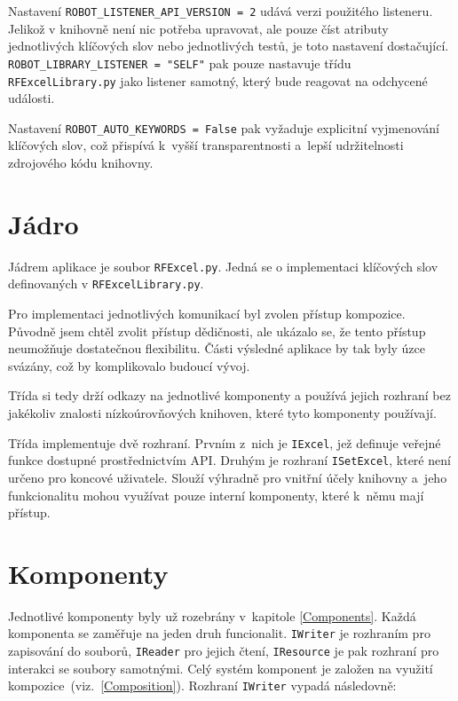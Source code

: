 Nastavení \texttt{ROBOT\_LISTENER\_API\_VERSION = 2} udává verzi použitého listeneru. Jelikož v knihovně není nic potřeba upravovat, ale pouze číst atributy jednotlivých klíčových slov nebo jednotlivých testů, je toto nastavení dostačující. \texttt{ROBOT\_LIBRARY\_LISTENER = "SELF"} pak pouze nastavuje třídu \texttt{RFExcelLibrary.py} jako listener samotný, který bude reagovat na odchycené události.

Nastavení \texttt{ROBOT\_AUTO\_KEYWORDS = False} pak vyžaduje explicitní vyjmenování klíčových slov, což přispívá k~vyšší transparentnosti a~lepší udržitelnosti zdrojového kódu knihovny.

\section{Jádro}

Jádrem aplikace je soubor \texttt{RFExcel.py}. Jedná se o implementaci klíčových slov definovaných v \texttt{RFExcelLibrary.py}.

Pro implementaci jednotlivých komunikací byl zvolen přístup kompozice. Původně jsem chtěl zvolit přístup dědičnosti, ale ukázalo se, že tento přístup neumožňuje dostatečnou flexibilitu. Části výsledné aplikace by tak byly úzce svázány, což by komplikovalo budoucí vývoj. 

Třída si tedy drží odkazy na jednotlivé komponenty a používá jejich rozhraní bez jakékoliv znalosti nízkoúrovňových knihoven, které tyto komponenty používají.

Třída implementuje dvě rozhraní. Prvním z~nich je \texttt{IExcel}, jež definuje veřejné funkce dostupné prostřednictvím API. Druhým je rozhraní \texttt{ISetExcel}, které není určeno pro koncové uživatele. Slouží výhradně pro vnitřní účely knihovny a~jeho funkcionalitu mohou využívat pouze interní komponenty, které k~němu mají přístup.

\section{Komponenty}

Jednotlivé komponenty byly už rozebrány v~kapitole \ref{Components}. Každá komponenta se zaměřuje na jeden druh funcionalit. \texttt{IWriter} je rozhraním pro zapisování do souborů, \texttt{IReader} pro jejich čtení, \texttt{IResource} je pak rozhraní pro interakci se soubory samotnými. Celý systém komponent je založen na využití kompozice~(viz.~\ref{Composition}). Rozhraní \texttt{IWriter} vypadá následovně:

